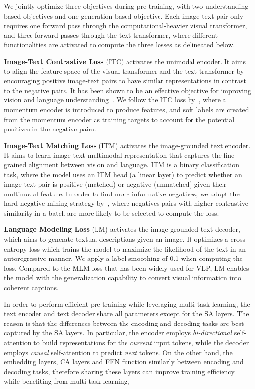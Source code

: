 We jointly optimize three objectives during pre-training, with two understanding-based objectives and one generation-based objective. Each image-text pair only requires one forward pass through the computational-heavier visual transformer, and three forward passes through the text transformer, where different functionalities are activated to compute the three losses as delineated below.

\textbf{Image-Text Contrastive Loss} (ITC) activates the unimodal encoder. It aims to align the feature space of the visual transformer and the text transformer by encouraging positive image-text pairs to have similar representations in contrast to the negative pairs. It has been shown to be an effective objective for improving vision and language understanding~\cite{clip, ALBEF}. We follow the ITC loss by~\citet{ALBEF},
where a momentum encoder is introduced to produce features, and soft labels are created from the momentum encoder as training targets to account for the potential positives in the negative pairs. 

\textbf{Image-Text Matching Loss} (ITM) activates the image-grounded text encoder. It aims to learn image-text multimodal representation that captures the fine-grained alignment between vision and language. ITM is a binary classification task, where the model uses an ITM head (a linear layer) to predict whether an image-text pair is positive (matched) or negative (unmatched) given their multimodal feature. In order to find more informative negatives, we adopt the hard negative mining strategy by~\citet{ALBEF},
where negatives pairs with higher contrastive similarity in a batch are more likely to be selected to compute the loss.

\textbf{Language Modeling Loss} (LM) activates the image-grounded text decoder, which aims to generate textual descriptions given an image. It optimizes a cross entropy loss which trains the model to maximize the likelihood of the text in an autoregressive manner. We apply a label smoothing of 0.1 when computing the loss. Compared to the MLM loss that has been widely-used for VLP, LM enables the model with the generalization capability to convert visual information into coherent captions.

In order to perform efficient pre-training while leveraging multi-task learning, the text encoder and text decoder share all parameters except for the SA layers. The reason is that the differences between the encoding and decoding tasks are best captured by the SA layers. In particular, the encoder employs \textit{bi-directional} self-attention to build representations for the \textit{current} input tokens, while the decoder employs \textit{causal} self-attention to predict \textit{next} tokens. On the other hand, the embedding layers, CA layers and FFN function similarly between encoding and decoding tasks, therefore sharing these layers can improve training efficiency while benefiting from multi-task learning,


